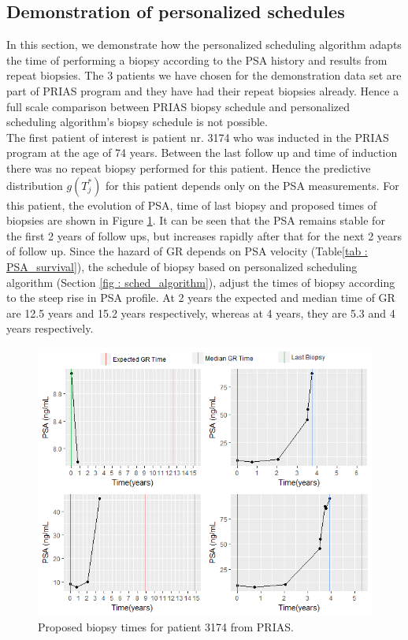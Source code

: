 \subsection{Demonstration of personalized schedules}
\label{subsec : demo_prias_pers_sc}
In this section, we demonstrate how the personalized scheduling algorithm adapts the time of performing a biopsy according to the PSA history and results from repeat biopsies. The 3 patients we have chosen for the demonstration data set are part of PRIAS program and they have had their repeat biopsies already. Hence a full scale comparison between PRIAS biopsy schedule and personalized scheduling algorithm's biopsy schedule is not possible.\\

The first patient of interest is patient nr. 3174 who was inducted in the PRIAS program at the age of 74 years. Between the last follow up and time of induction there was no repeat biopsy performed for this patient. Hence the predictive distribution $g(T^*_j)$  for this patient depends only on the PSA measurements. For this patient, the evolution of PSA, time of last biopsy and proposed times of biopsies are shown in Figure \ref{fig : prias_demo_pid_3174}. It can be seen that the PSA remains stable for the first 2 years of follow ups, but increases rapidly after that for the next 2 years of follow up. Since the hazard of GR depends on PSA velocity (Table\ref{tab : PSA_survival}), the schedule of biopsy based on personalized scheduling algorithm (Section \ref{fig : sched_algorithm}), adjust the times of biopsy according to the steep rise in PSA profile. At 2 years the expected and median time of GR are 12.5 years and 15.2 years respectively, whereas at 4 years, they are 5.3 and 4 years respectively.\\

\begin{figure}[!htb]
\centering
\captionsetup{justification=centering}
\includegraphics[width=\textwidth]{images/prias_demo/case_3174.png}
\caption{\label{fig : prias_demo_pid_3174} Proposed biopsy times for patient 3174 from PRIAS.}
\end{figure}

